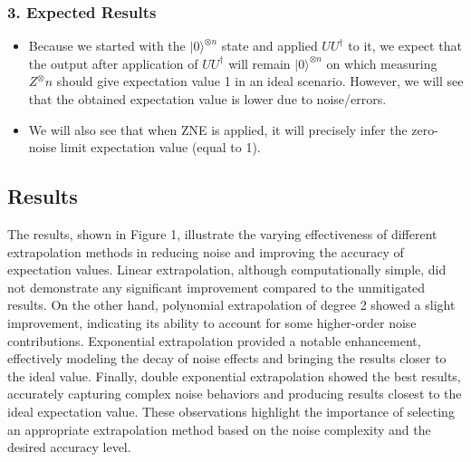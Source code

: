 \documentclass[12pt]{article}
\begin{document}
    \subsubsection*{3. Expected Results}
    \begin{itemize}
        \item Because we started with the $|0\rangle ^{\otimes n}$ state and applied $UU^\dagger$ to it, we expect that the output after application of $UU^\dagger$ will remain $|0\rangle ^{\otimes n}$ on which measuring $Z^\otimes n$ should give expectation value 1 in an ideal scenario. However, we will see that the obtained expectation value is lower due to noise/errors.
    
        \item We will also see that when ZNE is applied, it will precisely infer the zero-noise limit expectation value (equal to 1). 
    \end{itemize}

\subsection{Results}
The results, shown in Figure 1, illustrate the varying effectiveness of different extrapolation methods in reducing noise and improving the accuracy of expectation values. Linear extrapolation, although computationally simple, did not demonstrate any significant improvement compared to the unmitigated results. On the other hand, polynomial extrapolation of degree 2 showed a slight improvement, indicating its ability to account for some higher-order noise contributions. Exponential extrapolation provided a notable enhancement, effectively modeling the decay of noise effects and bringing the results closer to the ideal value. Finally, double exponential extrapolation showed the best results, accurately capturing complex noise behaviors and producing results closest to the ideal expectation value. These observations highlight the importance of selecting an appropriate extrapolation method based on the noise complexity and the desired accuracy level.
\end{document}
